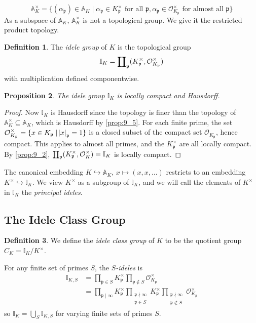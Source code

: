 \documentclass[11pt]{article}
\theoremstyle{definition}
\newtheorem{definition}{Definition}[section]
\theoremstyle{plain}
\newtheorem{proposition}[definition]{Proposition}
\theoremstyle{remark}
\newcommand{\bA}{\mathbb{A}}
\newcommand{\II}{\mathbb{I}}
\newcommand{\cO}{\mathcal{O}}
\newcommand{\fp}{\mathfrak{p}}
\newcommand{\rprod}{\mathrlap{\prod}{\coprod}}
\begin{document}
\begin{equation*}
    \bA_K^\times = \{(\alpha_\fp) \in \bA_K \mid \alpha_\fp \in K_\fp^\times \text{ for all } \fp, \alpha_\fp \in \cO_{K_\fp}^\times \text{ for almost all } \fp\}
\end{equation*}
As a subspace of $\bA_K$, $\bA_K^\times$ is not a topological group. We give it the restricted product topology.

\begin{definition}\label{def:9_6}
    The \emph{idele group} of $K$ is the topological group
    \begin{equation*}
        \II_K = \rprod_{\fp} (K_\fp^\times, \cO_{K_\fp}^\times)
    \end{equation*}
    with multiplication defined componentwise.
\end{definition}

\begin{proposition}\label{prop:9_7}
    The idele group $\II_K$ is locally compact and Hausdorff.
\end{proposition}
\begin{proof}
    Now $\II_K$ is Hausdorff since the topology is finer than the topology of $\bA_K^\times \subseteq \bA_K$, which is Hausdorff by \autoref{prop:9_5}. For each finite prime, the set $\cO_{K_\fp}^\times = \{x \in K_\fp \mid \abs{x}_\fp = 1\}$ is a closed subset of the compact set $\cO_{K_\fp}$, hence compact. This applies to almost all primes, and the $K_\fp^\times$ are all locally compact. By \autoref{prop:9_2}, $\rprod_\fp (K_\fp^\times, \cO_K^\times) = \II_K$ is locally compact.
\end{proof}

The canonical embedding $K \hookrightarrow \bA_K$, $x \mapsto (x, x, \ldots)$ restricts to an embedding $K^\times \hookrightarrow \II_K$. We view $K^\times$ as a subgroup of $\II_K$, and we will call the elements of $K^\times$ in $\II_K$ the \emph{principal ideles}.

\subsection{The Idele Class Group}

\begin{definition}\label{def:9_8}
    We define the \emph{idele class group} of $K$ to be the quotient group $C_K = \II_K / K^\times$.
\end{definition}

For any finite set of primes $S$, the \emph{$S$-ideles} is
\begin{align*}
    \II_{K,S}
    &= \prod_{\fp \in S} K_{\fp}^\times \prod_{\fp \notin S} \cO_{K_\fp}^\times\\
    &= \prod_{\fp \mid \infty} K_{\fp}^\times \prod_{\substack{\fp \nmid \infty \\ \fp \in S}} K_{\fp}^\times \prod_{\substack{\fp \nmid \infty \\ \fp \notin S}} \cO_{K_\fp}^\times
\end{align*}
so $\II_K = \bigcup_{S} \II_{K,S}$ for varying finite sets of primes $S$.
\end{document}
